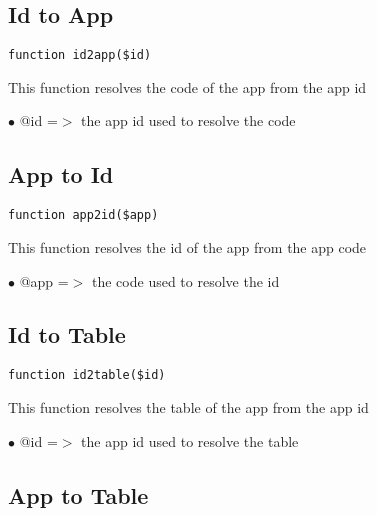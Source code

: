\documentclass[a4paper]{book}
\begin{document}
\hypertarget{toc24}{}
\subsection{Id to App}

\begin{lstlisting}
function id2app($id)
\end{lstlisting}

This function resolves the code of the app from the app id

\begin{compactitem}
\item[\color{myblue}$\bullet$] @id =$>$ the app id used to resolve the code
\end{compactitem}

\hypertarget{toc25}{}
\subsection{App to Id}

\begin{lstlisting}
function app2id($app)
\end{lstlisting}

This function resolves the id of the app from the app code

\begin{compactitem}
\item[\color{myblue}$\bullet$] @app =$>$ the code used to resolve the id
\end{compactitem}

\hypertarget{toc26}{}
\subsection{Id to Table}

\begin{lstlisting}
function id2table($id)
\end{lstlisting}

This function resolves the table of the app from the app id

\begin{compactitem}
\item[\color{myblue}$\bullet$] @id =$>$ the app id used to resolve the table
\end{compactitem}

\hypertarget{toc27}{}
\subsection{App to Table}
\end{document}
